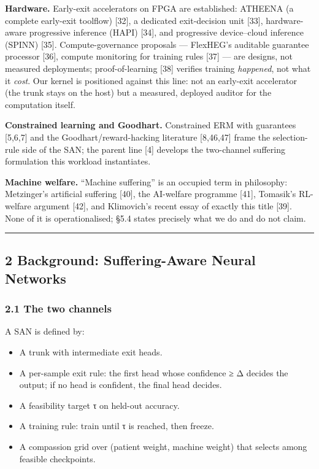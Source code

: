 \documentclass[
]{article}
\providecommand{\tightlist}{%
  \setlength{\itemsep}{0pt}\setlength{\parskip}{0pt}}
\begin{document}
\textbf{Hardware.} Early-exit accelerators on FPGA are established:
ATHEENA (a complete early-exit toolflow) {[}32{]}, a dedicated
exit-decision unit {[}33{]}, hardware-aware progressive inference (HAPI)
{[}34{]}, and progressive device--cloud inference (SPINN) {[}35{]}.
Compute-governance proposals --- FlexHEG's auditable guarantee processor
{[}36{]}, compute monitoring for training rules {[}37{]} --- are
designs, not measured deployments; proof-of-learning {[}38{]} verifies
training \emph{happened}, not what it \emph{cost}. Our kernel is
positioned against this line: not an early-exit accelerator (the trunk
stays on the host) but a measured, deployed auditor for the computation
itself.

\textbf{Constrained learning and Goodhart.} Constrained ERM with
guarantees {[}5,6,7{]} and the Goodhart/reward-hacking literature
{[}8,46,47{]} frame the selection-rule side of the SAN; the parent line
{[}4{]} develops the two-channel suffering formulation this workload
instantiates.

\textbf{Machine welfare.} ``Machine suffering'' is an occupied term in
philosophy: Metzinger's artificial suffering {[}40{]}, the AI-welfare
programme {[}41{]}, Tomasik's RL-welfare argument {[}42{]}, and
Klimovich's recent essay of exactly this title {[}39{]}. None of it is
operationalised; §5.4 states precisely what we do and do not claim.

\begin{center}\rule{0.5\linewidth}{0.5pt}\end{center}

\hypertarget{background-suffering-aware-neural-networks}{%
\subsection{2 Background: Suffering-Aware Neural
Networks}\label{background-suffering-aware-neural-networks}}

\hypertarget{the-two-channels}{%
\subsubsection{2.1 The two channels}\label{the-two-channels}}

A SAN is defined by:

\begin{itemize}
\tightlist
\item
  A trunk with intermediate exit heads.
\item
  A per-sample exit rule: the first head whose confidence ≥ Δ decides
  the output; if no head is confident, the final head decides.
\item
  A feasibility target τ on held-out accuracy.
\item
  A training rule: train until τ is reached, then freeze.
\item
  A compassion grid over (patient weight, machine weight) that selects
  among feasible checkpoints.
\end{itemize}
\end{document}
